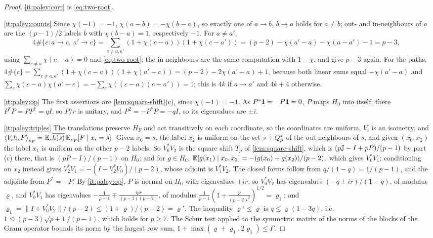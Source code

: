 \begin{proof}
\ref{it:paley:corr} is \eqref{eq:two-root}.

\ref{it:paley:counts} Since $\chi(-1)=-1$, $\chi(a-b)=-\chi(b-a)$, so exactly one of
$a\to b$, $b\to a$ holds for $a\ne b$; out- and in-neighbours of $a$ are the
$(p-1)/2$ labels $b$ with $\chi(b-a)=1$, respectively $-1$. For $a\ne a'$,
\[
 4\#\{c:a\to c,\ a'\to c\}=\sum_{c\ne a,a'}(1+\chi(c-a))(1+\chi(c-a'))
 =(p-2)-\chi(a'-a)-\chi(a-a')-1=p-3,
\]
using $\sum_{c\ne a}\chi(c-a)=0$ and \eqref{eq:two-root}; the in-neighbours are the
same computation with $1-\chi$, and give $p-3$ again. For the paths,
$4\#\{c\}=\sum_{c\ne a,a'}(1+\chi(c-a))(1+\chi(a'-c))=(p-2)-2\chi(a'-a)+1$,
because both linear sums equal $-\chi(a'-a)$ and
$\sum_c\chi(c-a)\chi(a'-c)=-\sum_c\chi((c-a)(c-a'))=1$; this is $4k$ if $a\to a'$
and $4k+4$ otherwise.

\ref{it:paley:op} The first assertions are \cref{lem:square-shift}(c), since
$\chi(-1)=-1$. As $P^*\mathbf 1=-P\mathbf 1=0$, $P$ maps $H_0$ into itself; there
$P^*P=PP^*=qI$, so $P/r$ is unitary, and $P^2=-P^*P=-qI$, so its eigenvalues
are $\pm i$.

\ref{it:paley:triples} The translations preserve $H_F$ and act transitively on
each coordinate, so the coordinates are uniform, $V_i$ is an isometry, and
$\left\langle V_ih,F\right\rangle_{\nu_F}=\mathbb E_s\overline{h(s)}\,\mathbb E_{\nu_F}[F\mid x_i=s]$. Given $x_0=s$, the label
$x_2$ is uniform on the set $s+Q_{p}^{*}$ of the out-neighbours of $s$, and given
$(x_0,x_2)$ the label $x_1$ is uniform on the other $p-2$ labels. So $V_0^*V_2$ is
the square shift $T_p$ of \cref{lem:square-shift}, which is
$(p\mathbb J-I+pP)/(p-1)$ by part (c) there, that is $(pP-I)/(p-1)$ on $H_0$; and
for $g\in H_0$, $\mathbb E[g(x_1)\mid x_0,x_2]=-(g(x_0)+g(x_2))/(p-2)$, which gives $V_0^*V_1$;
conditioning on $x_2$ instead gives $V_2^*V_1=-(I+V_2^*V_0)/(p-2)$, whose adjoint
is $V_1^*V_2$. The closed forms follow from $q/(1-q)=1/(p-1)$, and the adjoints
from $P^*=-P$. By \ref{it:paley:op}, $P$ is normal on $H_0$ with eigenvalues
$\pm ir$, so $V_0^*V_2$ has eigenvalues $(-q\pm ir)/(1-q)$, of modulus $\varrho$, and
$V_0^*V_1$ has eigenvalues $-\frac1{p-1}\mp\frac{ipr}{(p-1)(p-2)}$, of modulus
$\frac1{p-1}(1+\frac p{(p-2)^2})^{1/2}=\varrho_1$; and
$\varrho_1=\|I+V_0^*V_2\|/(p-2)\le(1+\varrho)/(p-2)=\varrho'$. The inequality $\varrho'\le\varrho$
is $q\le\varrho(1-3q)$, i.e.\ $1\le(p-3)\sqrt{p+1}/(p-1)$, which holds for $p\ge7$.
The Schur test applied to the symmetric matrix of the norms of the blocks of the
Gram operator bounds its norm by the largest row sum,
$1+\max(\varrho+\varrho_1,2\varrho_1)\le\Gamma$.


\end{proof}
